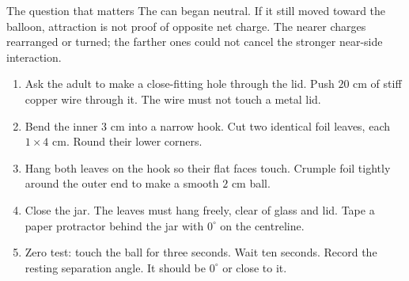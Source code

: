 \begin{telospanel}{The question that matters}
The can began neutral. If it still moved toward the balloon, attraction is not
proof of opposite net charge. The nearer charges rearranged or turned; the
farther ones could not cancel the stronger near-side interaction.
\end{telospanel}


\begin{enumerate}
\item Ask the adult to make a close-fitting hole through the lid. Push
  \(20\) cm of stiff copper wire through it. The wire must not touch a metal lid.
\item Bend the inner \(3\) cm into a narrow hook. Cut two identical foil leaves,
  each \(1\times4\) cm. Round their lower corners.
\item Hang both leaves on the hook so their flat faces touch. Crumple foil
  tightly around the outer end to make a smooth \(2\) cm ball.
\item Close the jar. The leaves must hang freely, clear of glass and lid.
  Tape a paper protractor behind the jar with \(0^\circ\) on the centreline.
\item Zero test: touch the ball for three seconds. Wait ten seconds. Record the
  resting separation angle. It should be \(0^\circ\) or close to it.
\end{enumerate}

\begin{center}
\end{center}

